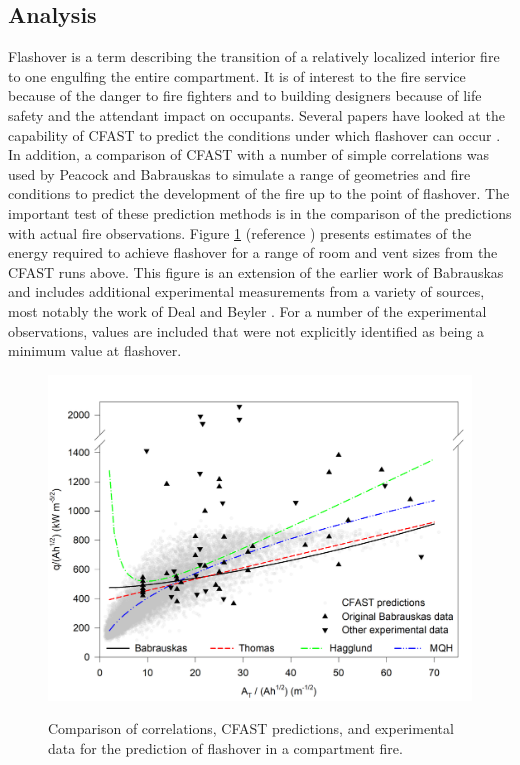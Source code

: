 \documentclass[12pt,twoside]{book}
\begin{document}
\subsection{Analysis}

Flashover is a term describing the transition of a relatively localized interior fire to one engulfing the entire compartment. It is of interest to the fire service because of the danger to fire fighters and to building designers because of life safety and the attendant impact on occupants. Several papers have looked at the capability of CFAST to predict the conditions under which flashover can occur \cite{Valid:Chow_Flashover, Valid:Luo_Flashover, Valid:Collier, Valid:White}. In addition, a comparison of CFAST with a number of simple correlations was used by Peacock and Babrauskas \cite{Valid:Peacock_Flashover_1,Valid:Peacock_Flashover_2} to simulate a range of geometries and fire conditions to predict the development of the fire up to the point of flashover. The important test of  these prediction methods is in the comparison of the predictions with actual fire observations. Figure \ref{figValidFlashover} (reference \cite{Valid:Peacock_Flashover_2}) presents estimates of the energy required to achieve flashover for a range of room and vent sizes from the CFAST runs above. This figure is an extension of the earlier work of Babrauskas  \cite{Valid:Babrauskas_Flashover} and includes additional experimental measurements from a variety of sources, most notably the work of Deal and Beyler \cite{Valid:DealandBeyler}. For a number of the experimental observations, values are included that were not explicitly identified as being a minimum value at flashover.

\begin{figure}
\begin{center}
\includegraphics[width=6.0000in]{../Validation_Guide/FIGURES/flashover.pdf}\\
\end{center}
\caption{Comparison of correlations, CFAST predictions, and experimental data for the prediction of flashover in a compartment fire.}
 \label{figValidFlashover}
\end{figure}
\end{document}
